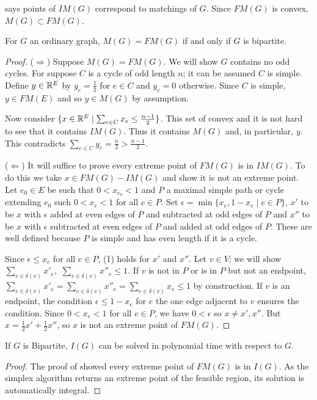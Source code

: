  says points of $IM(G)$ correspond to matchings of $G.$
Since $FM(G)$ is convex, $M(G) \subset FM(G)$.

\begin{theorem} \label{matching polytope} \cite{edmonds}
    For $G$ an ordinary graph, $M(G) = FM(G)$ if and only if $G$ is bipartite.
\end{theorem}

\begin{proof}

($\Rightarrow$) Suppose $M(G) = FM(G)$. We will show $G$ contains no odd cycles.
For suppose $C$ is a cycle of odd length $n$; it can be assumed $C$ is simple.
Define $y \in \mathbb{R}^E$ by $y_e = \frac{1}{2}$ for $e \in C$ and $y_e = 0$ otherwise. Since $C$ is simple, $y \in FM(E)$ and so $y \in M(G)$ by assumption. 
    
Now consider $\{x \in \mathbb{R}^E \mid \sum_{e \in C}x_e \leq \frac{n - 1}{2}\}$.
This set of convex and it is not hard to see that it contains $IM(G)$.
Thus it contains $M(G)$ and, in particular, $y$.
This contradicts $\sum_{e \in C}y_e = \frac{n}{2} > \frac{n - 1}{2}$.

($\Leftarrow$) It will suffice to prove every extreme point of $FM(G)$ is in $IM(G)$.
To do this we take $x \in FM(G) - IM(G)$ and show it is not an extreme point.
Let $e_0 \in E$ be such that $0 < x_{e_0} < 1$ and $P$ a maximal simple path or cycle extending $e_0$ such $0 < x_e < 1$ for all $e \in P$.
Set $\epsilon = \min\{x_e, 1 - x_e \mid e \in P\}$, $x'$ to be $x$ with $\epsilon$ added at even edges of $P$ and subtracted at odd edges of $P$ and $x''$ to be $x$ with $\epsilon$ subtracted at even edges of $P$ and added at odd edges of $P$.
These are well defined because $P$ is simple and has even length if it is a cycle.

Since $\epsilon \leq x_{e}$ for all $e \in P$,  (1) holds for $x'$ and $x''$.
Let $v \in V$; we will show $\sum_{e \in \delta(v)} x'_e,$ $\sum_{e \in \delta(v)} x''_e \leq 1$.
If $v$ is not in $P$ or is in $P$ but not an endpoint, $\sum_{e \in \delta(v)} x'_e = \sum_{e \in \delta(v)} x''_e = \sum_{e \in \delta(v)} x_e \leq 1$ by construction.
If $v$ is an endpoint, the condition $\epsilon \leq 1 - x_e$ for $e$ the one edge adjacent to $v$ ensures the condition.
Since $0 < x_e < 1$ for all $e \in P$, we have $0 < \epsilon$ so $x \neq x', x''$.
But $x = \frac{1}{2} x' + \frac{1}{2} x''$, so $x$ is not an extreme point of $FM(G)$.

\end{proof}

\begin{scholium}
    If $G$ is Bipartite, $I(G)$ can be solved in polynomial time with respect to $G$.
\end{scholium}

\begin{proof}
    The proof of  showed every extreme point of $FM(G)$ is in $I(G)$.
    As the simplex algorithm returns an extreme point of the feasible region, its solution is automatically integral. 
\end{proof}
